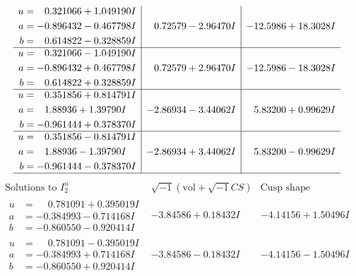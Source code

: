 \documentclass[1p]{elsarticle_modified}
\theoremstyle{definition}
\newcommand{\I}{\sqrt{-1}}
\begin{document}
$$\begin{array}{c|c|c}
\begin{aligned}
u &= \phantom{-}0.321066 + 1.049190 I \\
a &= -0.896432 - 0.467798 I \\
b &= \phantom{-}0.614822 - 0.328859 I\end{aligned}
 & \phantom{-}0.72579 - 2.96470 I & -12.5986 + 18.3028 I \\ \hline\begin{aligned}
u &= \phantom{-}0.321066 - 1.049190 I \\
a &= -0.896432 + 0.467798 I \\
b &= \phantom{-}0.614822 + 0.328859 I\end{aligned}
 & \phantom{-}0.72579 + 2.96470 I & -12.5986 - 18.3028 I \\ \hline\begin{aligned}
u &= \phantom{-}0.351856 + 0.814791 I \\
a &= \phantom{-}1.88936 + 1.39790 I \\
b &= -0.961444 + 0.378370 I\end{aligned}
 & -2.86934 - 3.44062 I & \phantom{-}5.83200 + 0.99629 I \\ \hline\begin{aligned}
u &= \phantom{-}0.351856 - 0.814791 I \\
a &= \phantom{-}1.88936 - 1.39790 I \\
b &= -0.961444 - 0.378370 I\end{aligned}
 & -2.86934 + 3.44062 I & \phantom{-}5.83200 - 0.99629 I\\
 \hline 
 \end{array}$$\newpage$$\begin{array}{c|c|c}  
\text{Solutions to }I^u_{2}& \I (\text{vol} + \sqrt{-1}CS) & \text{Cusp shape}\\
 \hline 
\begin{aligned}
u &= \phantom{-}0.781091 + 0.395019 I \\
a &= -0.384993 - 0.714168 I \\
b &= -0.860550 - 0.920414 I\end{aligned}
 & -3.84586 + 0.18432 I & -4.14156 + 1.50496 I \\ \hline\begin{aligned}
u &= \phantom{-}0.781091 - 0.395019 I \\
a &= -0.384993 + 0.714168 I \\
b &= -0.860550 + 0.920414 I\end{aligned}
 & -3.84586 - 0.18432 I & -4.14156 - 1.50496 I \\ \hline\begin{aligned}

\end{aligned}
\end{array}$$
\end{document}
